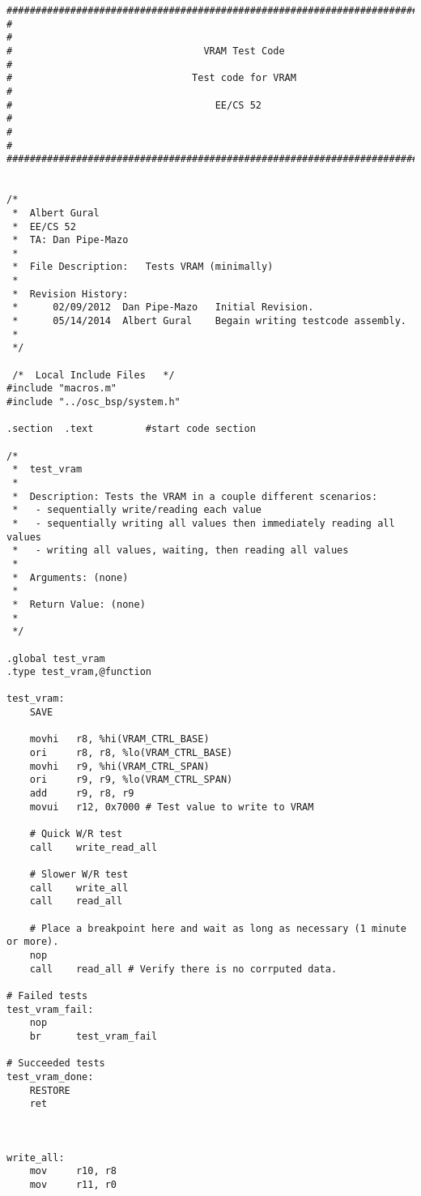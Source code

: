 \lstset{language=[niosii]Assembler}
\begin{lstlisting}
################################################################################
#                                                                              #
#                                 VRAM Test Code                               #
#                 	            Test code for VRAM                             #
#                                   EE/CS 52                                   #
#                                                                              #
################################################################################


/*
 *  Albert Gural
 *  EE/CS 52
 *  TA: Dan Pipe-Mazo
 *
 *  File Description:	Tests VRAM (minimally)
 *
 *  Revision History:
 *      02/09/2012  Dan Pipe-Mazo	Initial Revision.
 *		05/14/2014	Albert Gural	Begain writing testcode assembly.
 *
 */

 /*  Local Include Files   */
#include "macros.m"
#include "../osc_bsp/system.h"

.section  .text         #start code section

/*
 *  test_vram
 *
 *  Description: Tests the VRAM in a couple different scenarios:
 *   - sequentially write/reading each value
 *   - sequentially writing all values then immediately reading all values
 *   - writing all values, waiting, then reading all values
 *
 *  Arguments: (none)
 *
 *  Return Value: (none)
 *
 */

.global test_vram
.type test_vram,@function

test_vram:
	SAVE

	movhi	r8, %hi(VRAM_CTRL_BASE)
	ori		r8, r8, %lo(VRAM_CTRL_BASE)
	movhi	r9, %hi(VRAM_CTRL_SPAN)
	ori		r9, r9, %lo(VRAM_CTRL_SPAN)
	add		r9, r8, r9
	movui	r12, 0x7000 # Test value to write to VRAM

	# Quick W/R test
	call	write_read_all

	# Slower W/R test
	call	write_all
	call	read_all

	# Place a breakpoint here and wait as long as necessary (1 minute or more).
	nop
	call	read_all # Verify there is no corrputed data.

# Failed tests
test_vram_fail:
	nop
	br 		test_vram_fail

# Succeeded tests
test_vram_done:
	RESTORE
	ret



write_all:
	mov		r10, r8
	mov		r11, r0


\end{lstlisting}
